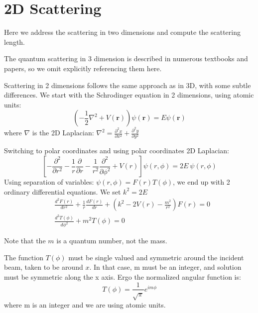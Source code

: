 \chapter{2D Scattering}

  Here we address the scattering in two dimensions and compute the scattering length.

  The quantum scattering in 3 dimension is described in numerous textbooks and papers, so we omit explicitly referencing them here.

  Scattering in 2 dimensions follows the same approach as in 3D, with some subtle differences.
  We start with the Schrodinger equation in 2 dimensions, using atomic units:
  \begin{equation}\label{2DS1}
      \left(-\frac{1}{2}\nabla^2 + V(\mathbf{r})\right)\psi(\mathbf{r}) = E\psi(\mathbf{r})
  \end{equation}
  where $ \nabla $ is the 2D Laplacian: $ \nabla^2 = \frac{\partial^2 x}{\partial x^2} + \frac{\partial^2 y}{\partial y^2} $

  Switching to polar coordinates and using polar coordinates 2D Laplacian:
  \begin{equation}
      \left[-\frac{\partial^2}{\partial r^2} - \frac{1}{r}\frac{\partial}{\partial r} - \frac{1}{r^2}\frac{\partial^2}{\partial\phi^2} + V(r)\right]\psi(r,\phi) = 2E\ \psi(r,\phi)
  \end{equation}
  Using separation of variables: $ \psi(r,\phi) = F(r)T(\phi) $, we end up with 2 ordinary differential equations. We set $ k^2 = 2E $
  \begin{equation}
  \begin{split}
   & \frac{d^2F(r)}{d r^2} +\frac{1}{r}\frac{d F(r)}{d r} +(k^2 -  2V(r) - \frac{m^2}{r^2})F(r) = 0\\[.8em]
   & \frac{d^2 T(\phi)}{d \phi^2} + m^2 T(\phi) = 0
  \end{split}
  \end{equation}

  Note that the $ m $ is a quantum number, not the mass. 

  The function $ T(\phi) $ must be single valued and symmetric around the incident beam, taken to be around $ x $. In that case, m must be an integer, and solution must be symmetric along the x axis. Ergo the normalized angular function is:
  \begin{equation}
T(\phi) = \frac{1}{\sqrt{\pi}}e^{i m\phi}
\end{equation}
where m is an integer and we are using atomic units.

